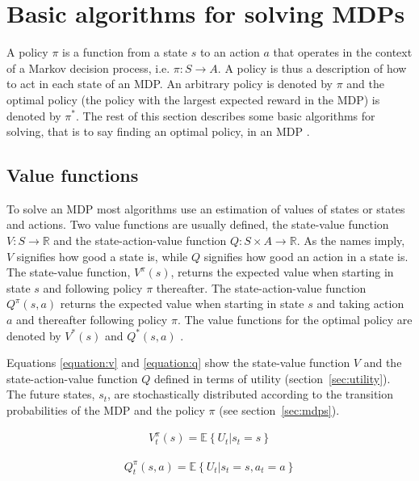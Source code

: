 \section{Basic algorithms for solving MDPs}

A policy $\pi$ is a function from a state $s$ to an action $a$ that operates in
the context of a Markov decision process, i.e. $\pi \colon S \to A$. A policy
is thus a description of how to act in each state of an MDP. An arbitrary
policy is denoted by $\pi$ and the optimal policy (the policy with the largest
expected reward in the MDP) is denoted by $\pi^*$. The rest of this section
describes some basic algorithms for solving, that is to say finding an optimal
policy, in an MDP \parencite{barto1998reinforcement}.

\subsection{Value functions}

To solve an MDP most algorithms use an estimation of values of states or
states and actions. Two value functions are usually defined, the state-value function $V :
S \to \mathbb R$ and the state-action-value function $Q : S \times A \to
\mathbb R$. As the names imply, $V$ signifies how good a state is, while $Q$
signifies how good an action in a state is. The state-value function,
$V^\pi(s)$, returns the expected value when starting in state $s$ and following
policy $\pi$ thereafter. The state-action-value function $Q^\pi(s, a)$ returns
the expected value when starting in state $s$ and taking action $a$ and
thereafter following policy $\pi$. The value functions for the optimal policy
are denoted by $V^*(s)$ and $Q^*(s, a)$ \parencite{barto1998reinforcement}. 

Equations \eqref{equation:v} and \eqref{equation:q} show the state-value
function $V$ and the state-action-value function $Q$ defined in terms of
utility (section~\ref{sec:utility}). The future states, $s_t$, are
stochastically distributed according to the transition probabilities of the MDP
and the policy $\pi$ (see section~\ref{sec:mdps}).

\begin{align}
\label{equation:v}
V_t^\pi(s) = \mathbb{E} \left\{
  \left. U_t
  \right\vert s_t = s
\right\}
\end{align}

\begin{align}
\label{equation:q}
Q_t^\pi(s, a) = \mathbb{E} \left\{
  \left. U_t
  \right\vert s_t = s, a_t = a
\right\}
\end{align}

